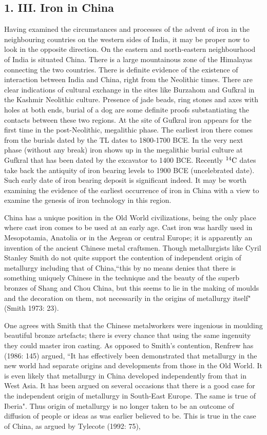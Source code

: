 \subsection*{1. III. Iron in China}\label{subsection-3}

Having examined the circumstances and processes of the advent of iron in the neighbouring countries on the western sides of India, it may be proper now to look in the opposite direction. On the eastern and north-eastern neighbourhood of India is situated China. There is a large mountainous zone of the Himalayas connecting the two countries. There is definite evidence of the existence of interaction between India and China, right from the Neolithic times. There are clear indications of cultural exchange in the sites like Burzahom and Gufkral in the Kashmir Neolithic culture. Presence of jade beads, ring stones and axes with holes at both ends, burial of a dog are some definite proofs substantiating the contacts between these two regions. At the site of Gufkral iron appears for the first time in the post-Neolithic, megalithic phase. The earliest iron there comes from the burials dated by the TL dates to 1800-1700 BCE. In the very next phase (without any break) iron shows up in the megalithic burial culture at Gufkral that has been dated by the excavator to 1400 BCE. Recently $^{14}{\rm C}$ dates take back the antiquity of iron bearing levels to 1900 BCE (uncelebrated date). Such early date of iron bearing deposit is significant indeed. It may be worth examining the evidence of the earliest occurrence of iron in China with a view to examine the genesis of iron technology in this region.

China has a unique position in the Old World civilizations, being the only place where cast iron comes to be used at an early age. Cast iron was hardly used in Mesopotamia, Anatolia or in the Aegean or central Europe; it is apparently an invention of the ancient Chinese metal craftsmen. Though metallurgists like Cyril Stanley Smith do not quite support the contention of independent origin of metallurgy including that of China,``this by no means denies that there is something uniquely Chinese in the technique and the beauty of the superb bronzes of Shang and Chou China, but this seems to lie in the making of moulds and the decoration on them, not necessarily in the origins of metallurgy itself" (Smith 1973: 23).

One agrees with Smith that the Chinese metalworkers were ingenious in moulding beautiful bronze artefacts; there is every chance that using the same ingenuity they could master iron casting. As opposed to Smith's contention, Renfrew has (1986: 145) argued, “It has effectively been demonstrated that metallurgy in the new world had separate origins and developments from those in the Old World. It is even likely that metallurgy in China developed independently from that in West Asia. It has been argued on several occasions that there is a good case for the independent origin of metallurgy in South-East Europe. The same is true of Iberia". Thus origin of metallurgy is no longer taken to be an outcome of diffusion of people or ideas as was earlier believed to be. This is true in the case of China, as argued by Tylecote (1992: 75),

